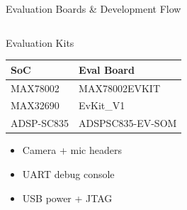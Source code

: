 \documentclass[aspectratio=169,10pt]{beamer}
\begin{document}
\begin{frame}{Evaluation Boards \& Development Flow}
  \begin{columns}[T]
    \begin{block}{Evaluation Kits}
      \renewcommand{\arraystretch}{1.3}
      \begin{tabular}{@{}ll@{}}
        \toprule
        SoC & Eval Board \\
        \midrule
        MAX78002 & MAX78002EVKIT \\
        MAX32690 & EvKit\_V1 \\
        ADSP-SC835 & ADSPSC835-EV-SOM \\
        \bottomrule
      \end{tabular}
      \vspace{6pt}
      \begin{itemize}\small
        \item Camera + mic headers
        \item UART debug console
        \item USB power + JTAG
      \end{itemize}
    \end{block}


\end{columns}
\end{frame}
\end{document}
